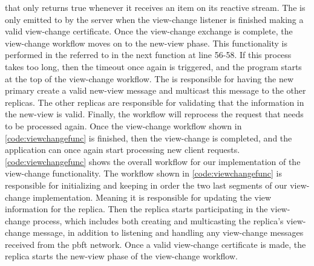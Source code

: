  that only returns true whenever it receives an item on its reactive stream. The  is only emitted to by the server when the view-change listener is finished making a valid view-change certificate. Once the view-change exchange is complete, the view-change workflow moves on to the new-view phase. This functionality is performed in the  referred to in the next  function at line 56-58. If this process takes too long, then the timeout once again is triggered, and the program starts at the top of the view-change workflow. The  is responsible for having the new primary create a valid new-view message and multicast this message to the other replicas. The other replicas are responsible for validating that the information in the new-view is valid. Finally, the workflow will reprocess the request that needs to be processed again. Once the view-change workflow shown in \autoref{code:viewchangefunc} is finished, then the view-change is completed, and the application can once again start processing new client requests.
\fi
\iffalse
\autoref{code:viewchangefunc} shows the overall workflow for our implementation of the view-change functionality.  The workflow shown in \autoref{code:viewchangefunc} is responsible for initializing and keeping in order the two last segments of our view-change implementation.  Meaning it is responsible for updating the view information for the replica. Then the replica starts participating in the view-change process, which includes both creating and multicasting the replica's view-change message, in addition to listening and handling any view-change messages received from the \ac{pbft} network. Once a valid view-change certificate is made, the replica starts the new-view phase of the view-change workflow. 

